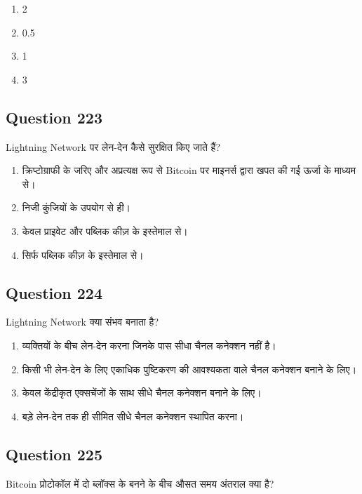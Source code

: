 \documentclass[12pt,a4paper]{article}
\begin{document}
\begin{enumerate}[label=\Alph*., leftmargin=*]
\item 2%
\item 0.5%
\item 1%
\item 3%
\end{enumerate}

\bigskip


\subsection*{Question 223}
Lightning Network पर लेन-देन कैसे सुरक्षित किए जाते हैं?

\begin{enumerate}[label=\Alph*., leftmargin=*]
\item क्रिप्टोग्राफी के जरिए और अप्रत्यक्ष रूप से Bitcoin पर माइनर्स द्वारा खपत की गई ऊर्जा के माध्यम से।
\item निजी कुंजियों के उपयोग से ही।
\item केवल प्राइवेट और पब्लिक कीज़ के इस्तेमाल से।
\item सिर्फ पब्लिक कीज़ के इस्तेमाल से।
\end{enumerate}

\bigskip


\subsection*{Question 224}
Lightning Network क्या संभव बनाता है?

\begin{enumerate}[label=\Alph*., leftmargin=*]
\item व्यक्तियों के बीच लेन-देन करना जिनके पास सीधा चैनल कनेक्शन नहीं है।
\item किसी भी लेन-देन के लिए एकाधिक पुष्टिकरण की आवश्यकता वाले चैनल कनेक्शन बनाने के लिए।
\item केवल केंद्रीकृत एक्सचेंजों के साथ सीधे चैनल कनेक्शन बनाने के लिए।
\item बड़े लेन-देन तक ही सीमित सीधे चैनल कनेक्शन स्थापित करना।
\end{enumerate}

\bigskip


\subsection*{Question 225}
Bitcoin प्रोटोकॉल में दो ब्लॉक्स के बनने के बीच औसत समय अंतराल क्या है?
\end{document}

